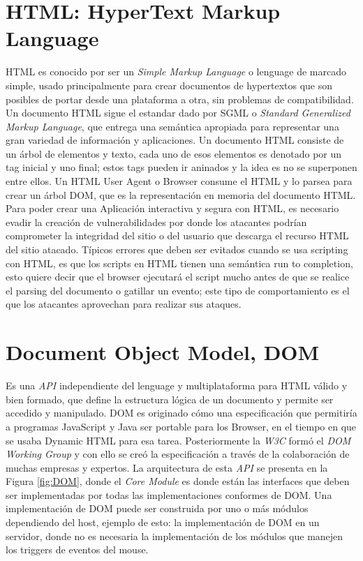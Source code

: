 \section{HTML: HyperText Markup Language}
\label{chap:HTML}
HTML \cite{htmlSpec} es conocido por ser un \textit{Simple Markup Language} o lenguage de marcado simple, usado principalmente para crear documentos de hypertextos que son posibles de portar desde una plataforma a otra, sin problemas de compatibilidad. Un documento HTML sigue el estandar dado por SGML o \textit{Standard Generalized Markup Language}, que entrega una semántica apropiada para representar una gran variedad de información y aplicaciones. Un documento HTML consiste de un árbol de elementos y texto, cada uno de esos elementos es denotado por un tag inicial y uno final; estos tags pueden ir aninados y la idea es no se superponen entre ellos. Un HTML User Agent o Browser consume el HTML y lo parsea para crear un árbol DOM, que es la representación en memoria del documento HTML.
Para poder crear una Aplicación interactiva y segura con HTML, es necesario evadir la creación de vulnerabilidades por donde los atacantes podrían comprometer la integridad del sitio o del usuario que descarga el recurso HTML del sitio atacado. Típicos errores que deben ser evitados cuando se usa scripting con HTML, es que los scripts en HTML tienen una semántica run to completion, esto quiere decir que el browser ejecutará el script mucho antes de que se realice el parsing del documento o gatillar un evento; este tipo de comportamiento es el que los atacantes aprovechan para realizar sus ataques.

\section{Document Object Model, DOM}
        Es una \textit{API} independiente del lenguage y multiplataforma para HTML válido y bien formado, que define la estructura lógica de un documento y permite ser accedido y manipulado. DOM es originado cómo una especificación que permitiría a programas JavaScript y Java ser portable para los Browser, en el tiempo en que se usaba Dynamic HTML para esa tarea. Posteriormente la \textit{W3C} \cite{w3c} formó el \textit{DOM Working Group} y con ello se creó la especificación a través de la colaboración de muchas empresas y expertos. La arquitectura de esta \textit{API} se presenta en la Figura \ref{fig:DOM}, donde el \textit{Core Module} es donde están las interfaces que deben ser implementadas por todas las implementaciones conformes de DOM. Una implementación de DOM puede ser construida por uno o más módulos dependiendo del host, ejemplo de esto: la implementación de DOM en un servidor, donde no es necesaria la implementación de los módulos que manejen los triggers de eventos del mouse.
        
